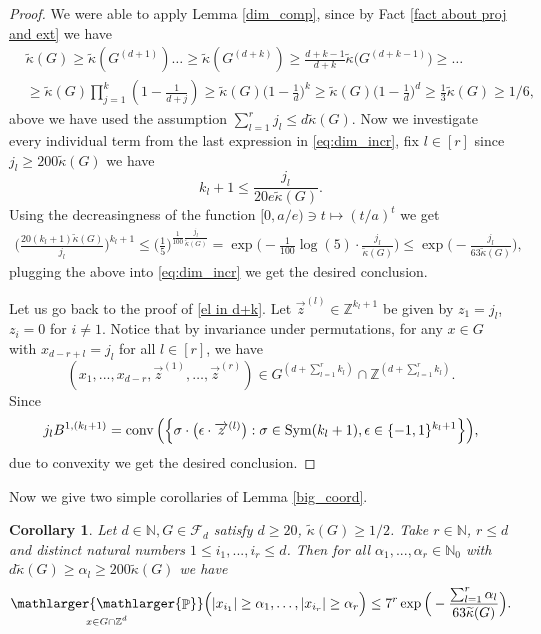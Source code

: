 \documentclass[a4paper,oneside, reqno]{amsart}
\numberwithin{equation}{section}
\newtheorem{Cor}[Thm]{Corollary}
\theoremstyle{definition}%
\theoremstyle{definition}
\theoremstyle{definition}%
\theoremstyle{definition}
\newcommand{\Pro}{\mathop{\mathbb{P}}}
\newcommand{\Z}{\mathbb{Z}}
\newcommand{\N}{\mathbb{N}}
\DeclareMathOperator{\Sym}{Sym}
\DeclareMathOperator{\conv}{conv}
\newcommand{\spr}[1]{\underset{_{\substack{#1}}}{\mathlarger{\mathlarger{\Pro}}}}
\begin{document}
\begin{proof}
We were able to apply Lemma \ref{dim_comp}, since by Fact \ref{fact about proj and ext} we have
\begin{align*}
&\widetilde{\kappa}(G) \ge \widetilde{\kappa}(G^{(d+1)}) \ldots \ge\widetilde{\kappa}(G^{(d+k)}) \ge \frac{d+k-1}{d+k} \widetilde{\kappa}\big(G^{(d+k-1)}\big) \ge \ldots \\
& \ge \widetilde{\kappa}(G) \prod_{j=1}^k(1-\frac{1}{d+j}) 
\ge \widetilde{\kappa}(G) \Big(1- \frac{1}{d} \Big)^k \ge \widetilde{\kappa}(G) \Big(1- \frac{1}{d} \Big)^d \ge \frac{1}{3} \widetilde{\kappa}(G) \ge 1/6,
\end{align*}
above we have used the assumption $\sum_{l=1}^r j_l \le d \widetilde{\kappa}(G)$.
Now we investigate every individual term from the last expression in \eqref{eq:dim_incr}, fix $l \in [r]$
since $j_l \ge 200 \widetilde{\kappa}(G)$ we have
\[
k_l+1 \le \frac{j_l}{20e \widetilde{\kappa}(G)}.
\]
Using the decreasingness of the function $[0, a/e) \ni t \mapsto (t/a)^t$ we get
\begin{align*}
    \Big( \frac{20(k_l+1) \widetilde{\kappa}(G)}{j_l} \Big)^{k_l+1} \le \Big( \frac{1}{5} \Big)^{\frac{1}{100} \frac{j_l}{\widetilde{\kappa}(G)}}= \exp \Big( - \frac{1}{100} \log(5) \cdot \frac{j_l}{\widetilde{\kappa}(G)} \Big) \le \exp \Big( -  \frac{j_l}{63\widetilde{\kappa}(G)} \Big),
\end{align*}
plugging the above into \eqref{eq:dim_incr} we get the desired conclusion. 
\par Let us go back to the proof of \eqref{el in d+k}.
Let $\overrightarrow{z}^{(l)} \in \Z^{k_l+1}$ be given by $z_1=j_l$, $z_i=0$ for $i \neq 1$. Notice that by invariance under permutations, for any $x \in G$ with $x_{d-r+l}=j_l$ for all $l \in [r]$, we have
\[
(x_1,...,x_{d-r},\overrightarrow{z}^{(1)}, \ldots, \overrightarrow{z}^{(r)}) \in G^{(d+\sum_{l=1}^r k_l)} \cap \Z^{(d+\sum_{l=1}^r k_l)}.
\]
Since 
\[
j_lB^{1,(k_l+1)}= \conv \Big( \Big\{ \sigma \cdot \big(\epsilon \cdot\overrightarrow{z}^{(l)} \big):\sigma \in \Sym(k_l+1), \\ \epsilon \in \{-1,1\}^{k_l+1}\Big\}\Big),
\]
due to convexity we get the desired conclusion.
\end{proof}
Now we give two simple corollaries of Lemma \ref{big_coord}.
\begin{Cor} \label{big_coord tail bound}
   Let $d \in \N, G \in \mathcal{F}_d$ satisfy $d \ge 20$, $\widetilde{\kappa}(G) \ge 1/2$. Take $r \in \N$, $r \le d$ and distinct natural numbers $1 \le i_1,...,i_r \le d$. Then for all $\alpha_1,...,\alpha_r \in \N_0$ with $d\widetilde{\kappa}(G) \ge \alpha_l \ge 200 \widetilde{\kappa}(G)$ we have
    \[
    \spr{x \in G \cap \Z^d} \Big( |x_{i_1}|\ge \alpha_1, \ldots,|x_{i_r}| \ge \alpha_r \Big) \le  7^{r}\exp\Big(- \frac{\sum_{l=1}^r\alpha_l}{63\widetilde{\kappa}(G)} \Big) .
    \]  
\end{Cor}
\end{document}
